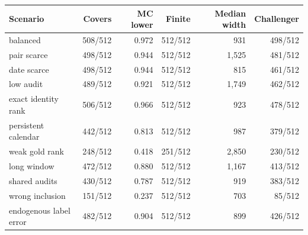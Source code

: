 \begin{center}\footnotesize\begin{tabular}{lrrrrr}\toprule
Scenario & Covers & MC lower & Finite & Median width & Challenger\\
\midrule
balanced & 508/512 & 0.972 & 512/512 & 931 & 498/512 \\
pair scarce & 498/512 & 0.944 & 512/512 & 1,525 & 481/512 \\
date scarce & 498/512 & 0.944 & 512/512 & 815 & 461/512 \\
low audit & 489/512 & 0.921 & 512/512 & 1,749 & 462/512 \\
exact identity rank & 506/512 & 0.966 & 512/512 & 923 & 478/512 \\
persistent calendar & 442/512 & 0.813 & 512/512 & 987 & 379/512 \\
weak gold rank & 248/512 & 0.418 & 251/512 & 2,850 & 230/512 \\
long window & 472/512 & 0.880 & 512/512 & 1,167 & 413/512 \\
shared audits & 430/512 & 0.787 & 512/512 & 919 & 383/512 \\
wrong inclusion & 151/512 & 0.237 & 512/512 & 703 & 85/512 \\
endogenous label error & 482/512 & 0.904 & 512/512 & 899 & 426/512 \\
\bottomrule\end{tabular}\end{center}
